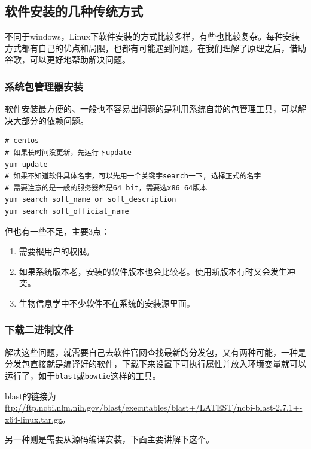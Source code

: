 \documentclass[]{article}
\providecommand{\tightlist}{%
  \setlength{\itemsep}{0pt}\setlength{\parskip}{0pt}}
\numberwithin{figure}{section}
\numberwithin{table}{section}
\begin{document}
\hypertarget{softInstallways}{%
\subsection{软件安装的几种传统方式}\label{softInstallways}}

不同于windows，Linux下软件安装的方式比较多样，有些也比较复杂。每种安装方式都有自己的优点和局限，也都有可能遇到问题。在我们理解了原理之后，借助谷歌，可以更好地帮助解决问题。

\hypertarget{system_package}{%
\subsubsection{系统包管理器安装}\label{system_package}}

软件安装最方便的、一般也不容易出问题的是利用系统自带的包管理工具，可以解决大部分的依赖问题。

\begin{verbatim}
# centos
# 如果长时间没更新，先运行下update
yum update
# 如果不知道软件具体名字，可以先用一个关键字search一下, 选择正式的名字
# 需要注意的是一般的服务器都是64 bit，需要选x86_64版本
yum search soft_name or soft_description
yum search soft_official_name
\end{verbatim}

但也有一些不足，主要3点：

\begin{enumerate}
\def\labelenumi{\arabic{enumi}.}
\tightlist
\item
  需要根用户的权限。
\item
  如果系统版本老，安装的软件版本也会比较老。使用新版本有时又会发生冲突。
\item
  生物信息学中不少软件不在系统的安装源里面。
\end{enumerate}

\hypertarget{binary}{%
\subsubsection{下载二进制文件}\label{binary}}

解决这些问题，就需要自己去软件官网查找最新的分发包，又有两种可能，一种是分发包直接就是编译好的软件，下载下来设置下可执行属性并放入环境变量就可以运行了，如于\texttt{blast}或\texttt{bowtie}这样的工具。

blast的链接为\url{ftp://ftp.ncbi.nlm.nih.gov/blast/executables/blast+/LATEST/ncbi-blast-2.7.1+-x64-linux.tar.gz}。

另一种则是需要从源码编译安装，下面主要讲解下这个。
\end{document}
